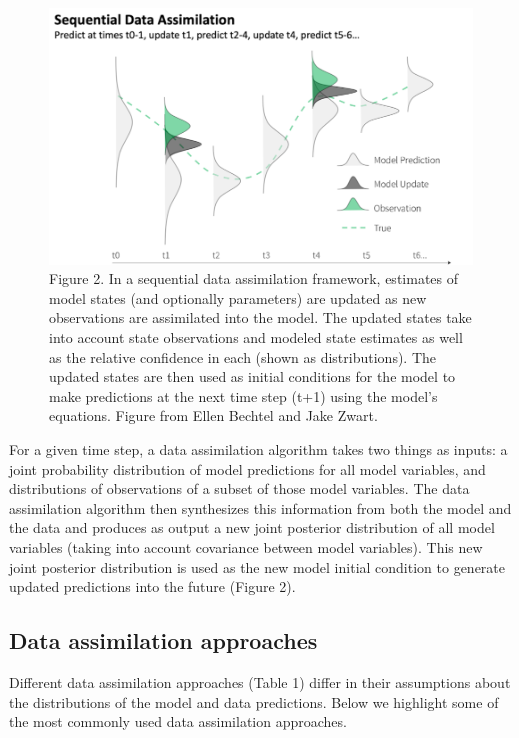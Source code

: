 \documentclass[
]{book}
\begin{document}
\begin{figure}
\centering
\includegraphics{images/Fig2_StatsMethodsUncertaintyTaskView.png}
\caption{Figure 2. In a sequential data assimilation framework, estimates of model states (and optionally parameters) are updated as new observations are assimilated into the model. The updated states take into account state observations and modeled state estimates as well as the relative confidence in each (shown as distributions). The updated states are then used as initial conditions for the model to make predictions at the next time step (t+1) using the model's equations. Figure from Ellen Bechtel and Jake Zwart.}
\end{figure}

For a given time step, a data assimilation algorithm takes two things as inputs: a joint probability distribution of model predictions for all model variables, and distributions of observations of a subset of those model variables. The data assimilation algorithm then synthesizes this information from both the model and the data and produces as output a new joint posterior distribution of all model variables (taking into account covariance between model variables). This new joint posterior distribution is used as the new model initial condition to generate updated predictions into the future (Figure 2).

\hypertarget{data-assimilation-approaches}{%
\subsection{Data assimilation approaches}\label{data-assimilation-approaches}}

Different data assimilation approaches (Table 1) differ in their assumptions about the distributions of the model and data predictions. Below we highlight some of the most commonly used data assimilation approaches.
\end{document}
